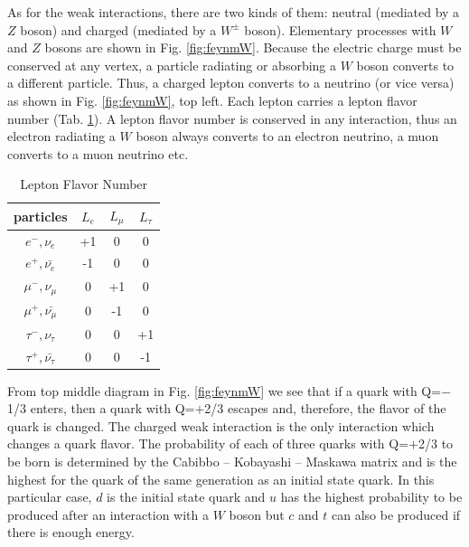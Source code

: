 As for the weak interactions, there are two kinds of them: neutral (mediated by a $Z$ boson) and charged (mediated by a $W^\pm$ boson). Elementary processes with $W$ and $Z$ bosons are shown in Fig. \ref{fig:feynmW}. Because the electric charge must be conserved at any vertex, a particle radiating or absorbing a $W$ boson converts to a different particle. Thus, a charged lepton converts to a neutrino (or vice versa) as shown in Fig. \ref{fig:feynmW}, top left. Each lepton carries a lepton flavor number (Tab. \ref{tab:LeptonFlavorNumber}). A lepton flavor number is conserved in any interaction, thus an electron radiating a $W$ boson  always converts to an electron neutrino, a muon converts to a muon neutrino etc.\\

 \begin{table}[h]
  \begin{center}
  \caption{ Lepton Flavor Number}
  \vspace{5 mm}
  \begin{tabular}{|c|c|c|c|}
     \hline
     particles & $L_e$ & $L_{\mu}$ & $L_{\tau}$ \\ \hline
     $e^-,\nu_e$ &  +1  &  0  &  0  \\ \hline 
     $e^+, \bar{\nu_e}$ &  -1  &  0  &  0  \\ \hline 
     $\mu^-,\nu_{\mu}$ &  0  &  +1  &  0  \\ \hline 
     $\mu^+, \bar{\nu_{\mu}}$ &  0  &  -1  &  0  \\ \hline 
     $\tau^-,\nu_{\tau}$ &  0  &  0  &  +1  \\ \hline 
     $\tau^+, \bar{\nu_{\tau}}$ &  0  &  0  &  -1  \\ \hline 
  \end{tabular}
  \label{tab:LeptonFlavorNumber}
  \end{center}
 \end{table}

From top middle diagram in Fig. \ref{fig:feynmW} we see that if a quark with Q=$-$1/3 enters, then a quark with Q=$+$2/3 escapes and, therefore, the flavor of the quark is changed. The charged weak interaction is the only interaction which changes a quark flavor. The probability of each of three quarks with Q=$+$2/3 to be born is determined by the Cabibbo – Kobayashi – Maskawa matrix and is the highest for the quark of the same generation as an initial state quark. In this particular case, $d$ is the initial state quark and $u$ has the highest probability to be produced after an interaction with a $W$ boson but $c$ and $t$ can also be produced if there is enough energy.\\

